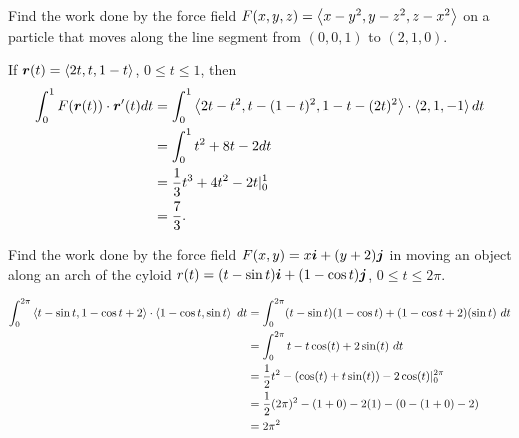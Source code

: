 \documentclass[12pt]{exam}
\begin{document}
\begin{questions}
 \question Find the work done by the force field \(F(x,y,z)=\left\langle x-y^2,y-z^2,z-x^2 \right\rangle\) on a particle that moves along the line segment from 
 \((0,0,1)\) to \((2,1,0)\).
 \ifprintanswers
        \begin{solution}
            If \(\bm{r}(t)=\left\langle 2t,t,1-t \right\rangle\), \(0\le t \le 1\), then 
            \begin{align*}
                \int_{0}^1 F(\bm{r}(t))\cdot \bm{r}'(t) dt & = \int_0^1 \left\langle 2t-t^2,t-(1-t)^2,1-t-(2t)^2 \right\rangle\cdot \left\langle 2,1,-1 \right\rangle dt\\
                & = \int_0^1 t^2+8t-2 dt\\
                & = \frac{1}{3}t^3+4t^2-2t|_0^1\\
                & = \frac{7}{3}.
            \end{align*}
        \end{solution}
    \else
        \vfill
    \fi 

 \question Find the work done by the force field \(F(x,y)=x\bm{i} +(y+2)\bm{j}\) in moving an object along an arch of the cyloid 
 \(r(t)=(t-\sin t)\bm{i} +(1-\cos t)\bm{j}\), \(0\le t \le 2\pi\).
 \ifprintanswers
        \begin{solution}
            \begin{align*}
                \int_{0}^{2\pi} \left\langle t-\sin t,1-\cos t+2 \right\rangle\cdot\left\langle 1-\cos t,\sin t \right\rangle ~dt 
                    & = \int_{0}^{2\pi} (t-\sin t)(1 - \cos t)+(1-\cos t+2)(\sin t)~dt\\
                    & = \int_{0}^{2\pi} t-t\cos(t)+2\sin(t)~dt\\
                    & = \frac{1}{2}t^2-(\cos(t)+t\sin(t))-2\cos(t)|_0^{2\pi}\\
                    & = \frac{1}{2}(2\pi)^2-(1+0)-2(1)-\left(0-(1+0)-2 \right)\\
                    & = 2\pi^2
            \end{align*}
        \end{solution}
    \else
        \vfill
    \fi

\end{questions}
\end{document}
